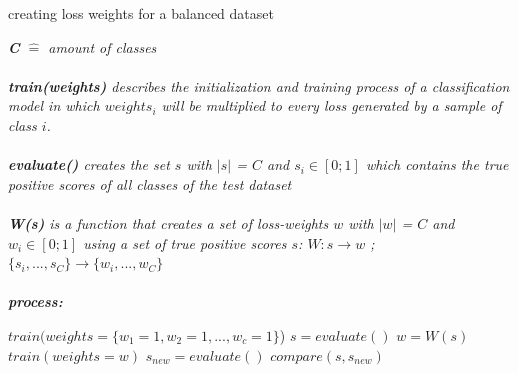\documentclass[journal]{IEEEtran}
\begin{document}
\begin{algorithm}[H]
        \caption{creating loss weights for a balanced dataset}

        \textit{\textbf{C} $\hat{=}$ amount of classes}
        \\
        \\ \textit{\textbf{train(weights)} describes the initialization and training process of a classification model in which $weights_i$ will be multiplied to every loss generated by a sample of class $i$.}
        \\
        \\ \textit{\textbf{evaluate()} creates the set $s$ with $\left|s\right|$ = $C$ and $s_i \in [0;1]$ which contains the true positive scores of all classes of the test dataset}
        \\
        \\ \textit{\textbf{W(s)} is a function that creates a set of loss-weights $w$ with $\left|w\right|$ = $C$ and $w_i \in [0;1]$ using a set of true positive scores $s$: $W: s \rightarrow w$ ; $\{s_i,...,s_C\} \rightarrow \{w_i,...,w_C\}$ }
        \\
        \\ \textit{\textbf{process:}}
        \begin{algorithmic}[1]
         \STATE $train(weights=\{w_1=1, w_2=1, ..., w_c=1\}$)
         \STATE $s = evaluate()$
         \STATE $w = W(s)$
         \STATE $train(weights=w)$
         \STATE $s_{new} = evaluate()$
         \STATE $compare(s, s_{new})$

        \end{algorithmic}
\end{algorithm}
\end{document}
